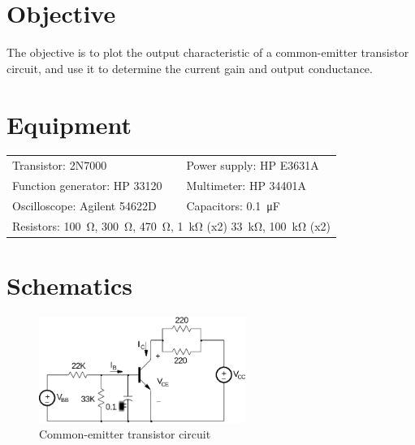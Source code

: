 

\section{Objective}

The objective is to plot the output characteristic of a common-emitter transistor circuit, and use it to determine the current gain and output conductance.

\section{Equipment}

\begin{tabular}{ll}
  \centering
  Transistor: 2N7000               & Power supply: HP E3631A            \\
  Function generator: HP 33120 & Multimeter: HP 34401A              \\
  Oscilloscope: Agilent 54622D & Capacitors: \SI{0.1}{\micro\farad} \\
  \multicolumn{2}{l}{Resistors: \SI{100}{\ohm}, \SI{300}{\ohm}, \SI{470}{\ohm}, \SI{1}{\kilo\ohm} (x2) \SI{33}{\kilo\ohm}, \SI{100}{\kilo\ohm} (x2)} \\
\end{tabular}

\section{Schematics}

\begin{figure}[hbtp]
  \centering
  \includegraphics[width=0.6\textwidth]{circuit}
  \caption{\label{fig:circuit} Common-emitter transistor circuit}
\end{figure}

